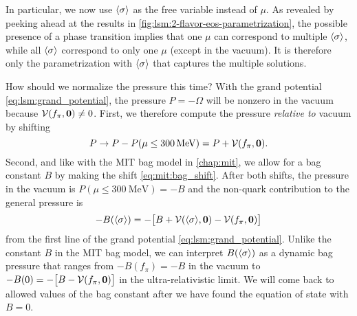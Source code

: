 In particular, we now use $\langle \sigma \rangle$ as the free variable instead of $\mu$.
As revealed by peeking ahead at the results in \cref{fig:lsm:2-flavor-eos-parametrization},
the possible presence of a phase transition implies that
one $\mu$ can correspond to multiple $\langle \sigma \rangle$,
while all $\langle \sigma \rangle$ correspond to only one $\mu$ (except in the vacuum).
It is therefore only the parametrization with $\langle \sigma \rangle$ that captures the multiple solutions.

How should we normalize the pressure this time?
With the grand potential \eqref{eq:lsm:grand_potential},
the pressure $P = - \Omega$ will be nonzero in the vacuum because $\mathcal{V}(f_\pi,{\bm{0}}) \neq 0$.
First, we therefore compute the pressure \emph{relative to} vacuum by shifting
\begin{equation}
	P \rightarrow P - P(\mu \leq \SI{300}{\mega\electronvolt}) = P + \mathcal{V}(f_\pi,{\bm{0}}) .
\label{eq:lsm:pressure_bagless}
\end{equation}
Second, and like with the MIT bag model in \cref{chap:mit},
we allow for a bag constant $B$ by making the shift \eqref{eq:mit:bag_shift}.
After both shifts,
the pressure in the vacuum is $P(\mu \leq \SI{300}{\mega\electronvolt}) = -B$
and the non-quark contribution to the general pressure is
\begin{equation}
	-B(\langle \sigma \rangle) = -\big[B+\mathcal{V}(\langle \sigma \rangle,{\bm{0}})-\mathcal{V}(f_\pi,{\bm{0}})\big]
\label{eq:lsm:bag_pressure}
\end{equation}
from the first line of the grand potential \eqref{eq:lsm:grand_potential}.
Unlike the constant $B$ in the MIT bag model,
we can interpret $B(\langle \sigma \rangle)$ as a dynamic bag pressure that ranges from $-B(f_\pi)=-B$ in the vacuum to $-B(0) = -\big[B-\mathcal{V}(f_\pi,{\bm{0}})\big]$ in the ultra-relativistic limit.
We will come back to allowed values of the bag constant after we have found the equation of state with $B=0$.

